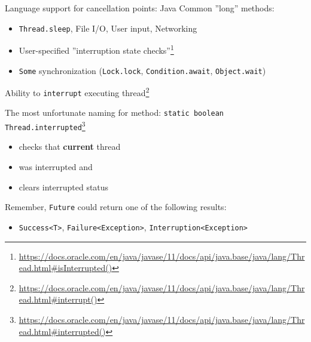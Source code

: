 \begin{frame}[t]{Language support for cancellation points: Java}
Common ''long'' methods:
\begin{itemize}
    \item \texttt{Thread.sleep}, File I/O, User input, Networking
    \item User-specified ''interruption state checks''\footnote{\tiny\url{https://docs.oracle.com/en/java/javase/11/docs/api/java.base/java/lang/Thread.html#isInterrupted()}}
    \pause
    \item \texttt{Some} synchronization (\texttt{Lock.lock}, \texttt{Condition.await}, \texttt{Object.wait})    
\end{itemize}

\pause
Ability to \texttt{interrupt} executing thread\footnote<3->{\tiny\url{https://docs.oracle.com/en/java/javase/11/docs/api/java.base/java/lang/Thread.html#interrupt()}}

\pause

The most unfortunate naming for method: \texttt{static boolean Thread.interrupted}\footnote<4->{\tiny\url{https://docs.oracle.com/en/java/javase/11/docs/api/java.base/java/lang/Thread.html#interrupted()}}
\begin{itemize}
    \item checks that \textbf{current} thread
    \item was interrupted and
    \item clears interrupted status
\end{itemize}

\pause

Remember, \texttt{Future} could return one of the following results:
\begin{itemize}
    \item \texttt{Success<T>}, \texttt{Failure<Exception>}, \texttt{Interruption<Exception>}
\end{itemize}
 
\end{frame}



